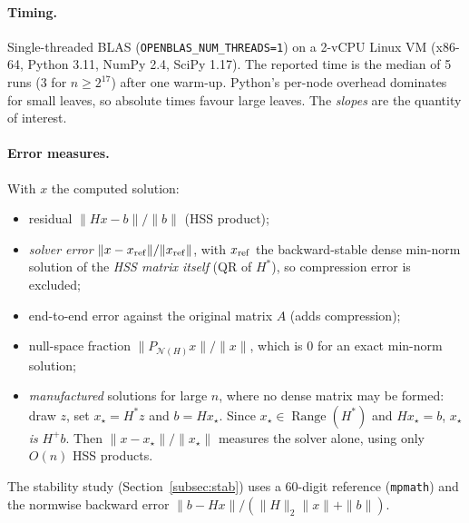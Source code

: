 \paragraph{Timing.} Single-threaded BLAS (\texttt{OPENBLAS\_NUM\_THREADS=1}) on a 2-vCPU Linux VM
(x86-64, Python 3.11, NumPy 2.4, SciPy 1.17). The reported time is the median of 5 runs (3 for $n\ge2^{17}$)
after one warm-up. Python's per-node overhead dominates for small leaves, so absolute times
favour large leaves. The \emph{slopes} are the quantity of interest.

\paragraph{Error measures.} With $x$ the computed solution:
\begin{itemize}[leftmargin=1.5em,itemsep=1pt]
\item residual $\|Hx-b\|/\|b\|$ (HSS product);
\item \emph{solver error} $\|x-x_{\rm ref}\|/\|x_{\rm ref}\|$, with $x_{\rm ref}$ the backward-stable
dense min-norm solution of the \emph{HSS matrix itself} (QR of $H^*$), so compression error is
excluded;
\item end-to-end error against the original matrix $A$ (adds compression);
\item null-space fraction $\|P_{\mathcal N(H)}x\|/\|x\|$, which is $0$ for an exact min-norm solution;
\item \emph{manufactured} solutions for large $n$, where no dense matrix may be formed: draw $z$,
set $x_\star=H^*z$ and $b=Hx_\star$. Since $x_\star\in\operatorname{Range}(H^*)$ and $Hx_\star=b$,
$x_\star$ \emph{is} $H^+b$. Then $\|x-x_\star\|/\|x_\star\|$ measures the solver alone, using only
$O(n)$ HSS products.
\end{itemize}
The stability study (Section~\ref{subsec:stab}) uses a 60-digit reference (\texttt{mpmath}) and the
normwise backward error $\|b-Hx\|/(\|H\|_2\|x\|+\|b\|)$.

